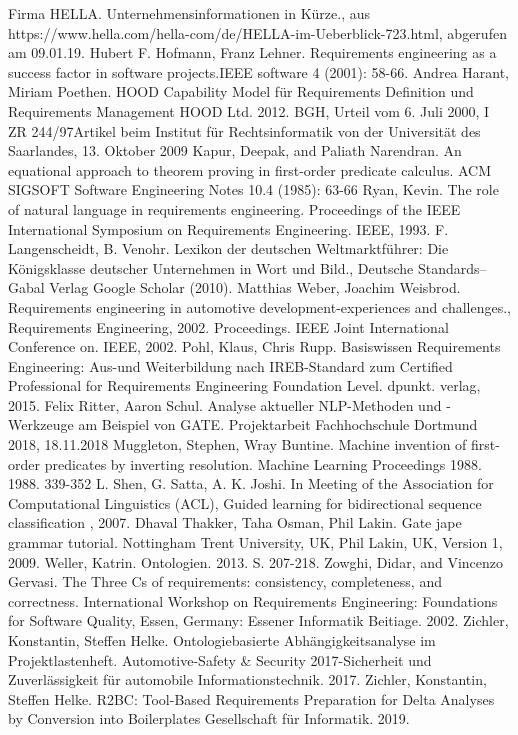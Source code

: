 \documentclass[12pt]{report}
\begin{document}
\begin{thebibliography}{20}
Firma HELLA. \glqq Unternehmensinformationen in Kürze.\grqq , aus https://www.hella.com/hella-com/de/HELLA-im-Ueberblick-723.html, abgerufen am 09.01.19.
 Hubert F. Hofmann, Franz Lehner. \glqq Requirements engineering as a success factor in software projects.\grqq IEEE software 4 (2001): 58-66.
Andrea Harant, Miriam Poethen. \glqq HOOD Capability Model für Requirements Definition und Requirements Management \grqq{} HOOD Ltd. 2012.
BGH, \glqq Urteil vom 6. Juli 2000, I ZR 244/97\grqq Artikel beim Institut für Rechtsinformatik von der Universität des Saarlandes, 13. Oktober 2009
Kapur, Deepak, and Paliath Narendran. \glqq  An equational approach to theorem proving in first-order predicate calculus.\grqq{}  ACM SIGSOFT Software Engineering Notes 10.4 (1985): 63-66
Ryan, Kevin. \glqq The role of natural language in requirements engineering.\grqq{} Proceedings of the IEEE International Symposium on Requirements Engineering. IEEE, 1993.
F. Langenscheidt, B. Venohr. \glqq Lexikon der deutschen Weltmarktführer: Die Königsklasse deutscher Unternehmen in Wort und Bild.\grqq ,  Deutsche Standards–Gabal Verlag Google Scholar (2010).
Matthias Weber, Joachim Weisbrod. \glqq Requirements engineering in automotive development-experiences and challenges.\grqq , Requirements Engineering, 2002. Proceedings. IEEE Joint International Conference on. IEEE, 2002.
 Pohl, Klaus, Chris Rupp. \glqq Basiswissen Requirements Engineering: Aus-und Weiterbildung nach IREB-Standard zum Certified Professional for Requirements Engineering Foundation Level.\grqq{} dpunkt. verlag, 2015.
Felix Ritter, Aaron Schul. \glqq Analyse aktueller NLP-Methoden und -Werkzeuge am Beispiel von GATE.\grqq{} Projektarbeit Fachhochschule Dortmund 2018, 18.11.2018
Muggleton, Stephen, Wray Buntine. \glqq  Machine invention of first-order predicates by inverting resolution.\grqq{}  Machine Learning Proceedings 1988. 1988. 339-352
 L. Shen, G. Satta, A. K. Joshi. In Meeting of the Association for Computational Linguistics (ACL), \glqq  Guided learning for bidirectional sequence classification\grqq{} , 2007.
Dhaval Thakker, Taha Osman, Phil Lakin. \glqq Gate jape grammar tutorial.\grqq{} Nottingham Trent University, UK, Phil Lakin, UK, Version 1, 2009.
 Weller, Katrin. \glqq Ontologien.\grqq{} 2013. S. 207-218.
 Zowghi, Didar, and Vincenzo Gervasi. \glqq The Three Cs of requirements: consistency, completeness, and correctness.\grqq{} International Workshop on Requirements Engineering: Foundations for Software Quality, Essen, Germany: Essener Informatik Beitiage. 2002.
 Zichler, Konstantin, Steffen Helke. \glqq Ontologiebasierte Abhängigkeitsanalyse im Projektlastenheft.\grqq{} Automotive-Safety \& Security 2017-Sicherheit und Zuverlässigkeit für automobile Informationstechnik. 2017.
 Zichler, Konstantin, Steffen Helke. \glqq R2BC: Tool-Based Requirements Preparation for Delta Analyses by Conversion into Boilerplates \grqq{} Gesellschaft für Informatik. 2019.


\end{thebibliography}
\end{document}
